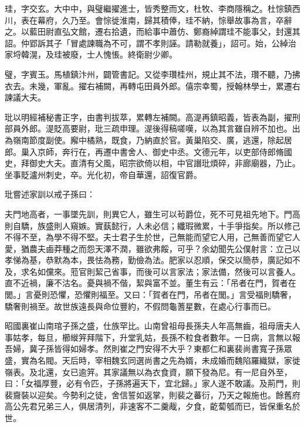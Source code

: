 \begin{pinyinscope}
 珪，字交玄。大中中，與璧繼擢進士，皆秀整而文，杜牧、李商隱稱之。杜悰鎮西川，表在幕府，久乃至。會悰徙淮南，歸其積俸，珪不納，悰舉故事為言，卒辭之。以藍田尉直弘文館，遷右拾遺，而給事中蕭仿、鄭裔綽謂珪不能事父，封還其詔。仲郢訴其子「冒處諫職為不可，謂不孝則誣。請勒就養」，詔可。始，公綽治家埒韓滉，及珪被廢，士人愧悵。終衛尉少卿。



 璧，字賓玉。馬植鎮汴州，闢管書記。又從李瓚桂州，規止其不法，瓚不聽，乃拂衣去。未幾，軍亂。擢右補闕，再轉屯田員外郎。僖宗幸蜀，授翰林學士，累遷右諫議大夫。



 玭以明經補秘書正字，由書判拔萃，累轉左補闕。高湜再鎮昭義，皆表為副，擢刑部員外郎。湜貶高要尉，玭三疏申理。湜後得稿嗟嘆，以為其言雖自辨不加也。出為嶺南節度副使。廨中橘熟，既食，乃納直於官。黃巢陷交、廣，逃還，除起居郎。巢入京師，奔行在，再遷中書舍人、御史中丞。文德元年，以吏部侍郎脩國史，拜御史大夫。直清有父風，昭宗欲倚以相，中官譖玭煩碎，非廊廟器，乃止。坐事貶瀘州刺史，卒。光化初，帝自華還，詔復官爵。



 玭嘗述家訓以戒子孫曰：



 夫門地高者，一事墜先訓，則異它人，雖生可以茍爵位，死不可見祖先地下。門高則自驕，族盛則人窺嫉。實蓺懿行，人未必信；纖瑕微累，十手爭指矣。所以修己不得不至，為學不得不堅。夫士君子生於世，己無能而望它人用，己無善而望它人愛，猶農夫鹵莽種之而怨天澤不潤，雖欲弗餒，可乎？余幼聞先公僕射言：立己以孝悌為基，恭默為本，畏怯為務，勤儉為法。肥家以忍順，保交以簡恭，廣記如不及，求名如儻來。蒞官則絜己省事，而後可以言家法；家法備，然後可以言養人。直不近禍，廉不沽名。憂與禍不偕，絜與富不並。董生有云：「吊者在門，賀者在閭。」言憂則恐懼，恐懼則福至。又曰：「賀者在門，吊者在閭。」言受福則驕奢，驕奢則禍至。故世族遠長與命位豐約，不假問龜蓍星數，在處心行事而已。



 昭國裏崔山南琯子孫之盛，仕族罕比。山南曾祖母長孫夫人年高無齒，祖母唐夫人事姑孝，每旦，櫛縰笄拜階下，升堂乳姑，長孫不粒食者數年。一日病，言無以報吾婦，冀子孫皆得如婦孝。然則崔之門安得不大乎？東都仁和裏裴尚書寬子孫眾盛，實為名閥。天后時，宰相魏玄同選尚書之先為婿，未成婚而魏陷羅織獄，家徙嶺表。及北還，女已逾笄。其家議無以為衣食資，願下發為尼。有一尼自外至，曰：「女福厚豐，必有令匹，子孫將遍天下，宜北歸。」家人遂不敢議。及荊門，則裴齎裝以迎矣。今勢利之徒，舍信誓如返掌，則裴之蕃衍，乃天之報施也。餘舊府高公先君兄弟三人，俱居清列，非速客不二羹胾，夕食，齕蔔瓠而已，皆保重名於世。




\end{pinyinscope}
